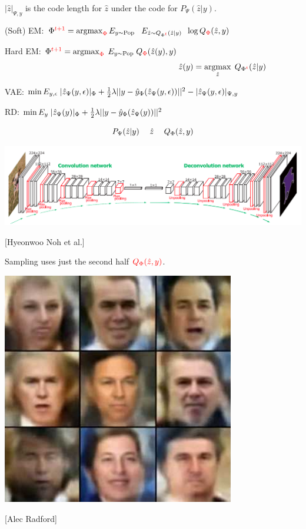 {\vfill
$|\hat{z}|_{\Psi,y}$ is the code length for $\hat{z}$ under the code for $P_\Psi(\hat{z}|y)$.


(Soft) EM: $\Phi^{\color{red} t+1} = \operatorname*{argmax}_{\color{red} \Phi} E_{y \sim \mathrm{Pop}}\;\;\;E_{\hat{z} \sim Q_{\Phi^{\color{red} t}}(\hat{z}|y)}\; \;\log Q_{\color{red} \Phi}(\hat{z},y)$

\vfill
Hard EM: $\Phi^{\color{red} t+1} = \operatorname*{argmax}_{\color{red} \Phi}\; E_{y \sim \mathrm{Pop}}\;Q_{\color{red} \Phi}(\hat{z}(y),y)$
$$\hspace{17em} \hat{z}(y) = \argmax_{\hat{z}}\;Q_{\Phi^{\color{red} t}}(\hat{z}|y)$$

\vfill
VAE: $\min E_{y,\epsilon}\;|\hat{z}_\Psi(y,\epsilon)|_\Phi +  \frac{1}{2}\lambda||y - \hat{y}_\Phi(\hat{z}_\Psi(y,\epsilon))||^2 - |\hat{z}_\Psi(y,\epsilon)|_{\Psi,y}$

\vfill
RD:  $\min E_{y}\;|\hat{z}_\Psi(y)|_\Phi +  \frac{1}{2}\lambda||y - \hat{y}_\Phi(\hat{z}_\Psi(y))||^2$




$$P_\Psi(\hat{z}|y) \hspace{3ex} \hat{z} \hspace{3ex}  Q_\Phi(\hat{z},y)$$

\centerline{\includegraphics[width=6in]{../images/Deconv}}
\centerline{\large [Hyeonwoo Noh et al.]}

\vfill
Sampling uses just the second half ${\color{red} Q_\Phi(\hat{z},y)}$.


\vfill
\centerline{\includegraphics[width = 4in]{../images/VariationalFaces}}
\centerline{[Alec Radford]}

}
